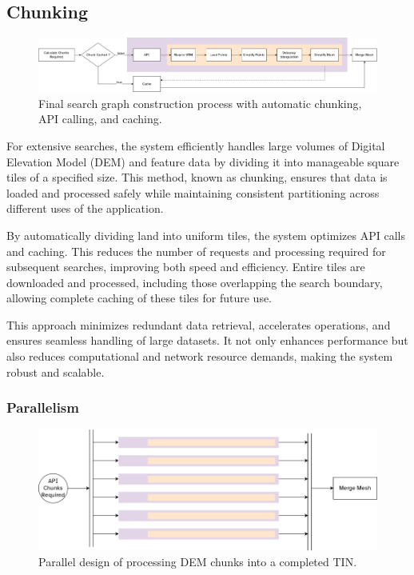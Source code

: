 \documentclass[12pt]{article}
\begin{document}
\subsection{Chunking}

\begin{figure}[H]
  \centering
  \includegraphics[width=1\textwidth]{assets/meshConstruction.png}
  \caption{Final search graph construction process with automatic chunking, API calling, and caching.}\label{fig:meshConstruction:full}
\end{figure}

For extensive searches, the system efficiently handles large volumes of Digital Elevation Model (DEM) and feature data by dividing it into manageable square tiles of a specified size. This method, known as chunking, ensures that data is loaded and processed safely while maintaining consistent partitioning across different uses of the application.

By automatically dividing land into uniform tiles, the system optimizes API calls and caching. This reduces the number of requests and processing required for subsequent searches, improving both speed and efficiency. Entire tiles are downloaded and processed, including those overlapping the search boundary, allowing complete caching of these tiles for future use.

This approach minimizes redundant data retrieval, accelerates operations, and ensures seamless handling of large datasets. It not only enhances performance but also reduces computational and network resource demands, making the system robust and scalable.

\subsubsection{Parallelism}

\begin{figure}[H]
  \centering
  \includegraphics[width=1\textwidth]{assets/meshConstruction-parallel.png}
  \caption{Parallel design of processing DEM chunks into a completed TIN.}
  \label{fig:meshConstruction:thread}
\end{figure}
\end{document}
